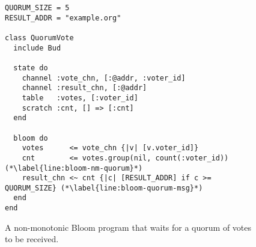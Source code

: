 \begin{figure}[t]
\begin{scriptsize}
\begin{lstlisting}
QUORUM_SIZE = 5
RESULT_ADDR = "example.org"

class QuorumVote
  include Bud

  state do
    channel :vote_chn, [:@addr, :voter_id]
    channel :result_chn, [:@addr]
    table   :votes, [:voter_id]
    scratch :cnt, [] => [:cnt]
  end

  bloom do
    votes      <= vote_chn {|v| [v.voter_id]}
    cnt        <= votes.group(nil, count(:voter_id)) (*\label{line:bloom-nm-quorum}*)
    result_chn <~ cnt {|c| [RESULT_ADDR] if c >= QUORUM_SIZE} (*\label{line:bloom-quorum-msg}*)
  end
end
\end{lstlisting}
\end{scriptsize}
\caption{A non-monotonic Bloom program that waits for a quorum of votes to be received.}
\label{fig:bloom-nm-quorum}
\end{figure}
